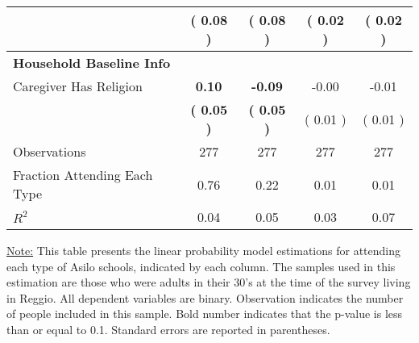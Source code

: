 \begin{table}[H]
{\begin{tabular}{lcccc}
\quad  & (     0.08 ) & (     0.08 )  & (     0.02 )  & (     0.02 )  \\
\midrule
\textbf{Household Baseline Info} \\
\quad Caregiver Has Religion & \textbf{     0.10} & \textbf{    -0.09} &     -0.00 &     -0.01 \\
\quad  & \textbf{(     0.05 )} & \textbf{(     0.05 )}  & (     0.01 )  & (     0.01 )  \\
\midrule
Observations & 277 & 277 & 277 & 277 \\
Fraction Attending Each Type &      0.76 &      0.22 &      0.01 &      0.01 \\
\midrule
$ R^2$ &      0.04 &      0.05 &      0.03 &      0.07 \\
\bottomrule
\end{tabular}}
\end{table}
\begin{scriptsize}
\noindent\underline{Note:} This table presents the linear probability model estimations for attending each type of Asilo schools, indicated by each column. The samples used in this estimation are those who were adults in their 30's at the time of the survey living in Reggio. All dependent variables are binary. Observation indicates the number of people included in this sample. Bold number indicates that the p-value is less than or equal to 0.1. Standard errors are reported in parentheses.
\end{scriptsize}
